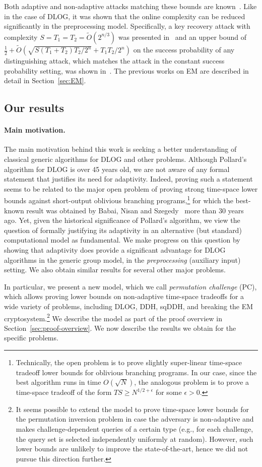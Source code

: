 \documentclass[11pt]{article}
\begin{document}
Both adaptive and non-adaptive attacks matching these bounds are known~\cite{BW00,Daemen91,DKS15}. Like in the case of DLOG, it was shown that the online complexity can be reduced significantly in the preprocessing model. Specifically, a key recovery attack with complexity $S=T_1=T_2=\tilde{O}(2^{n/3})$ was presented in~\cite{FouqueJM14} and an upper bound of $\frac{1}{2}+ \tilde{O}(\sqrt{S(T_1+T_2)T_2/2^n}+T_1 T_2/2^n)$ on the success probability of any distinguishing attack, which matches the attack in the constant success probability setting, was shown in~\cite{CorettiDG18}. The previous works on EM are described in detail in Section~\ref{sec:EM}.  

\subsection{Our results}
\label{sec:results}

\paragraph{Main motivation.} The main motivation behind this work is seeking a better understanding of classical generic algorithms for DLOG and other problems.
Although Pollard's algorithm for DLOG is over 45 years old, we are not aware of any formal statement that justifies its need for adaptivity.
Indeed, proving such a statement seems to be related to the major open problem of proving strong time-space lower bounds against short-output oblivious branching programs,\footnote{Technically, the open problem is to prove slightly super-linear time-space tradeoff lower bounds for oblivious branching programs.
In our case, since the best algorithm runs in time $O(\sqrt{N})$, the analogous problem is to prove a time-space tradeoff of the form $TS \geq N^{1/2 + \epsilon}$ for some $\epsilon > 0$.}  for which the best-known result was obtained by Babai, Nisan and Szegedy~\cite{BabaiNS92} more than 30 years ago.
Yet, given the historical significance of Pollard's algorithm, we view the question of formally justifying its adaptivity in an alternative (but standard) computational model as fundamental. We make progress on this question by showing that adaptivity does provide a significant advantage for DLOG algorithms in the generic group model, in the \emph{preprocessing} (auxiliary input) setting. We also obtain similar results for several other major problems.

In particular, we present a new model, which we call \emph{permutation challenge} (PC), which allows proving lower bounds on non-adaptive time-space tradeoffs for a wide variety of problems, including DLOG, DDH, sqDDH, and breaking the EM cryptosystem.\footnote{It seems possible to extend the model to prove time-space lower bounds for the permutation inversion problem in case the adversary is non-adaptive and makes challenge-dependent queries of a certain type (e.g., for each challenge, the query set is selected independently uniformly at random). However, such lower bounds are unlikely to improve the state-of-the-art, hence we did not pursue this direction further.}
We describe the model as part of the proof overview in Section~\ref{sec:proof-overview}. We now describe the results we obtain for the specific problems. 
\end{document}
